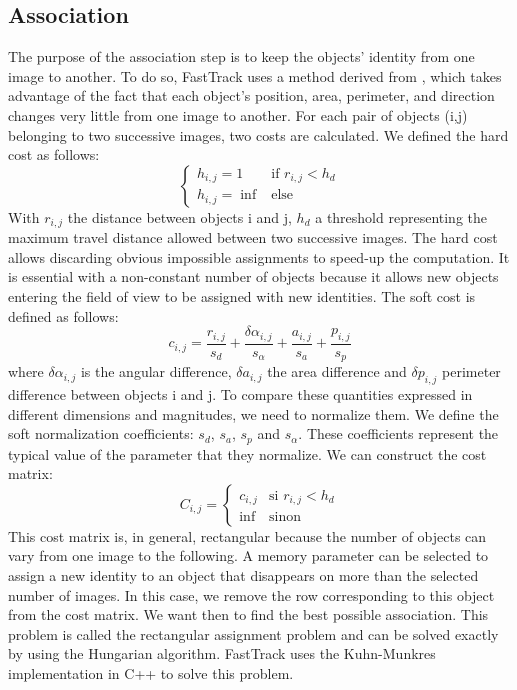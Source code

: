 		\subsection{Association}
		The purpose of the association step is to keep the objects' identity from one image to another. To do so, FastTrack uses a method derived from \cite{}, which takes advantage of the fact that each object's position, area, perimeter, and direction changes very little from one image to another.
		For each pair of objects (i,j) belonging to two successive images, two costs are calculated.
		We defined the hard cost as follows:
        $$
        \left\{
        	\begin{array}{ll}
        		h_{i,j} = 1 & \mbox{if } r_{i,j} < h_{d} \\
        		h_{i,j} = \inf & \mbox{else }
        	\end{array}
        \right.
        $$
        With $r_{i,j}$ the distance between objects i and j, $h_{d}$ a threshold representing the maximum travel distance allowed between two successive images. The hard cost allows discarding obvious impossible assignments to speed-up the computation. It is essential with a non-constant number of objects because it allows new objects entering the field of view to be assigned with new identities.
		The soft cost is defined as follows:
		$$
        c_{i,j} = \frac{r_{i,j}}{s_d} + \frac{\delta\alpha_{i,j}}{s_{\alpha}} + \frac{a_{i,j}}{s_a} + \frac{p_{i,j}}{s_p}
		$$
		where $\delta\alpha_{i,j}$ is the angular difference, $\delta a_{i,j}$ the area difference and $\delta p_{i,j}$ perimeter difference between objects i and j. To compare these quantities expressed in different dimensions and magnitudes, we need to normalize them. We define the soft normalization coefficients: $s_{d}$, $s_{a}$, $s_{p}$ and $s_{\alpha}$. These coefficients represent the typical value of the parameter that they normalize.
        We can construct the cost matrix:
		$$
        C_{i,j} = \left\{
        	\begin{array}{ll}
        		c_{i,j} & \mbox{si } r_{i,j} < h_{d} \\
        		\inf & \mbox{sinon }
        	\end{array}
        \right.
        $$
        This cost matrix is, in general, rectangular because the number of objects can vary from one image to the following. A memory parameter can be selected to assign a new identity to an object that disappears on more than the selected number of images. In this case, we remove the row corresponding to this object from the cost matrix.
        We want then to find the best possible association. This problem is called the rectangular assignment problem and can be solved exactly by using the Hungarian algorithm. FastTrack uses the Kuhn-Munkres implementation in C++ to solve this problem.


